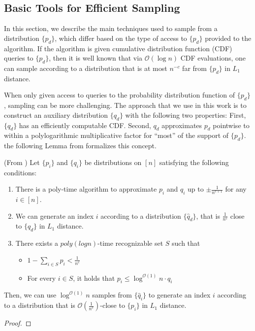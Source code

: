 






\subsection{Basic Tools for Efficient Sampling}
\label{sec:basic_tools_for_efficient_sampling}
In this section, we describe the main techniques used to sample from a distribution $\{ p_d\}$,
which differ based on the type of access to $\{p_d\}$ provided to the algorithm.
If the algorithm is given cumulative distribution function (CDF) queries to $\{p_d\}$,
then it is well known that via $\mathcal O(\log n)$ CDF evaluations, one can sample according
to a distribution that is at most $n^{-c}$ far from $\{p_d\}$ in $L_1$ distance.

When only given access to queries to the probability distribution function of $\{p_d\}$, sampling can be more challenging.
The approach that we use in this work is to construct an auxiliary distribution $\{q_d\}$ with the following two properties:
First, $\{ q_d\}$ has an efficiently computable CDF.
Second, $q_d$ approximates $p_d$ pointwise to within a polylogarithmic multiplicative factor for ``most'' of the support of $\{ p_d\}$.
the following Lemma from \cite{huge} formalizes this concept. %
\begin{lemma}
\label{lem:rejection_sampling} (From \cite{huge})
Let $\{p_i\}$ and $\{q_i\}$ be distributions on $[n]$ satisfying the following conditions:
\begin{enumerate}
\item There is a poly-time algorithm to approximate $p_i$ and $q_i$ up to $\pm \frac{1}{n^{c+1}}$ for any $i\in [n]$.
    \item We can generate an index $i$ according to a distribution $\{\hat q_d\}$, that is $ \frac{1}{n^c}$ close to $\{q_d\}$ in $L_1$ distance.
    \item There exists a $poly(log n)$-time recognizable set $S$ such that
    \begin{itemize}
        \item $1-\sum\limits_{i\in S} p_i < \frac 1{n^c}$
        \item For every $i\in S$, it holds that $p_i\le \log^{\mathcal{O}(1)} n\cdot q_i$
    \end{itemize}
\end{enumerate}
Then, we can use $\log^{\mathcal O(1)}n$ samples from $\{\hat q_i\}$ to generate an index $i$
according to a distribution that is $ \mathcal O\left(\frac{1}{n^c}\right)$-close to $\{p_i\}$ in $L_1$ distance.
\end{lemma}
\begin{proof}

\end{proof}

